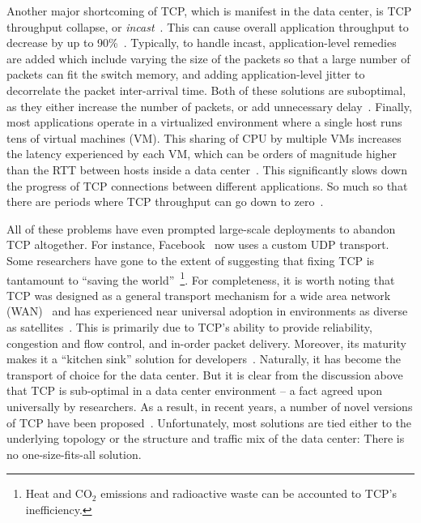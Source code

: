 \documentclass[a4paper,12pt,twoside,openright]{report}
\begin{document}
Another major shortcoming of TCP, which is manifest in the data center, is TCP
throughput collapse, or
\emph{incast}~\cite{Chen:2009:UTI,Vasudevan:2009:SEF,Wu:2010:IIC,Alizadeh:2010:DCT}.
This can cause overall application throughput to decrease by up to
90\%~\cite{Vasudevan:2009:SEF}. Typically, to handle incast, application-level
remedies are added which include varying the size of the packets so that a large
number of packets can fit the switch memory, and adding application-level jitter
to decorrelate the packet inter-arrival time. Both of these solutions are
suboptimal, as they either increase the number of packets, or add unnecessary
delay~\cite{Alizadeh:2010:DCT}. Finally, most applications operate in a
virtualized environment where a single host runs tens of virtual machines (VM).
This sharing of CPU by multiple VMs increases the latency experienced by each
VM, which can be orders of magnitude higher than the RTT between hosts inside a
data center~\cite{Gamage:2011:OFI,Kangarlou:2010:VIT}. This significantly slows
down the progress of TCP connections between different applications. So much so
that there are periods where TCP throughput can go down to
zero~\cite{Wang:2010:IVN}.

All of these problems have even prompted large-scale deployments to abandon TCP
altogether. For instance, Facebook~\cite{Facebook} now uses a custom UDP
transport. Some researchers have gone to the extent of suggesting that fixing
TCP is tantamount to ``saving the world''~\cite{Lyon:2008:TII}\footnote{Heat and
CO$_{2}$ emissions and radioactive waste can be accounted to TCP's
inefficiency.}. For completeness, it is worth noting that TCP was designed as a
general transport mechanism for a wide area network (WAN)~\cite{Clark:1988:DPD}
and has experienced near universal adoption in environments as diverse as
satellites~\cite{Henderson:1999:TPF}. This is primarily due to TCP's ability to
provide reliability, congestion and flow control, and in-order packet delivery.
Moreover, its maturity makes it a ``kitchen sink'' solution for
developers~\cite{Vasudevan:2009:SEF}. Naturally, it has become the transport of
choice for the data center. But it is clear from the discussion above that TCP
is sub-optimal in a data center environment -- a fact agreed upon universally by
researchers. As a result, in recent years, a number of novel versions of TCP
have been
proposed~\cite{Alizadeh:2010:DCT,Wu:2010:IIC,Wilson:2011:BNL,Vasudevan:2009:SEF,Chen:2009:UTI}.
Unfortunately, most solutions are tied either to the underlying topology or the
structure and traffic mix of the data center: There is no one-size-fits-all
solution.
\end{document}
